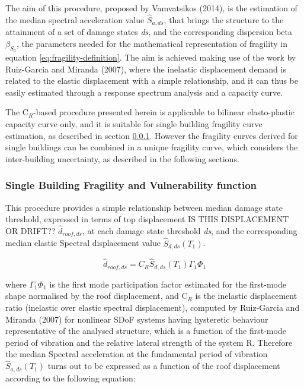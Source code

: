 The aim of this procedure, proposed by Vamvatsikos (2014), is the estimation of the median spectral acceleration value $\hat{S}_{a,ds}$, that brings the structure to the attainment of a set of damage states \textit{ds}, and the corresponding dispersion beta $\beta_{S_a}$, the parameters needed for the mathematical representation of fragility in equation \ref{eq:fragility-definition}. The aim is achieved making use of the work by Ruiz-Garcia and Miranda (2007), where the inelastic displacement demand is related to the elastic displacement with a simple relationship, and it can thus be easily estimated through a response spectrum analysis and a capacity curve.

The C$_R$-based procedure presented herein is applicable to bilinear elasto-plastic capacity curve only, and it is suitable for single building fragility curve estimation, as described in section \ref{subsubsec:single-building}. However the fragility curves derived for single buildings can be combined in a unique fragility curve, which considers the inter-building uncertainty, as described in the following sections.

\subsubsection{Single Building Fragility and Vulnerability function}
\label{subsubsec:single-building}
This procedure provides a simple relationship between median damage state threshold, expressed in terms of top displacement IS THIS DISPLACEMENT OR DRIFT?? $\hat{d}_{roof, ds}$, at each damage state threshold \textit{ds}, and the corresponding median elastic Spectral displacement value $\hat{S}_{d,ds}(T_1)$.

\begin{equation}
\hat{d}_{roof, ds} = C_R \hat{S}_{d, ds}(T_1) \Gamma_1 \Phi_1
\end{equation}

where $\Gamma_1 \Phi_1$ is the first mode participation factor estimated for the first-mode shape normalised by the roof displacement, and C$_R$ is the inelastic displacement ratio (inelastic over elastic spectral displacement), computed by Ruiz-Garcia and Miranda (2007) for nonlinear SDoF systems having hysteretic behaviour representative of the analysed structure, which is a function of the first-mode period of vibration and the relative lateral strength of the system R. Therefore the median Spectral acceleration at the fundamental period of vibration $\hat{S}_{a,ds}(T_1)$ turns out to be expressed as a function of the roof displacement according to the following equation:


